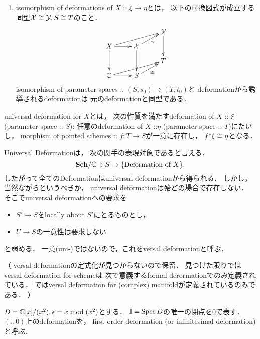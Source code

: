 \documentclass[a4paper]{jsarticle}
\newcommand{\dualnum}{\mathbb{I}}
\newcommand{\defX}{\mathcal{X}}
\newcommand{\defY}{\mathcal{Y}}
\begin{document}
\begin{Def}
\begin{enumerate}[label=(\roman*), leftmargin=*]
    \item
        isomorphism of deformations of $X$ :: $\xi \to \eta$とは，
        以下の可換図式が成立する同型$\defX \iso \defY, S \iso T$のこと．
        \[\xymatrix@R=8pt{
                {} & {} & \defY \ar[dd]\\
            X \ar[r]\ar[dd]\ar[rru]& \defX \ar[dd]\ar[ru]_-{\iso}& {} \\
            {} & {} & T \\
            \C \ar[r]\ar[rru]& S \ar[ru]_-{\iso}& {}
        }\]
        isomorphism of parameter spaces :: $(S, s_0) \to (T, t_0)$と
        deformationから誘導されるdeformationは
        元のdeformationと同型である．
    \end{enumerate}
    \end{Def}

    \begin{Def}
        universal deformation for $X$とは，
        次の性質を満たすdeformation of $X$ :: $\xi$ (parameter space :: $S$):
        任意のdeformation of $X$ ::$\eta$ (parameter space :: $T$)にたいし，
        morphism of pointed schemes :: $f: T \to S$が一意に存在し，
        $f^* \xi \cong \eta$となる．
    \end{Def}
    Universal Deformationは，
    次の関手の表現対象であると言える．
    \[ \mathbf{Sch}/\mathbb{C} \ni S \mapsto \{ \text{Deformation of $X$} \}. \]
    したがって全てのDeformationはuniversal deformationから得られる．
    しかし，当然ながらというべきか，
    universal deformationは殆どの場合で存在しない．
    そこでuniversal deformationへの要求を
    \begin{itemize}
        \item $S' \to S$をlocally about $S'$にとるものとし，
        \item $U \to S$の一意性は要求しない
    \end{itemize}
    と弱める．
    一意(uni-)ではないので，これをversal deformationと呼ぶ．

    \begin{Def}
        （
        versal deformationの定式化が見つからないので保留．
        見つけた限りではversal deformation for schemeは
        次で意義するformal derormationでのみ定義されている．
        \cite{GACII}ではversal deformation for (complex) manifoldが定義されているのみである．
        ）
    \end{Def}

    \begin{Def}
        $D=\mathbb{C}[x]/(x^2), \epsilon=x \bmod (x^2)$とする．
        $\dualnum=\Spec D$の唯一の閉点を$0$で表す．
        $(\dualnum, 0)$上のdeformationを，
        first order deformation (or infinitesimal deformation)と呼ぶ．
    \end{Def}
\end{document}
